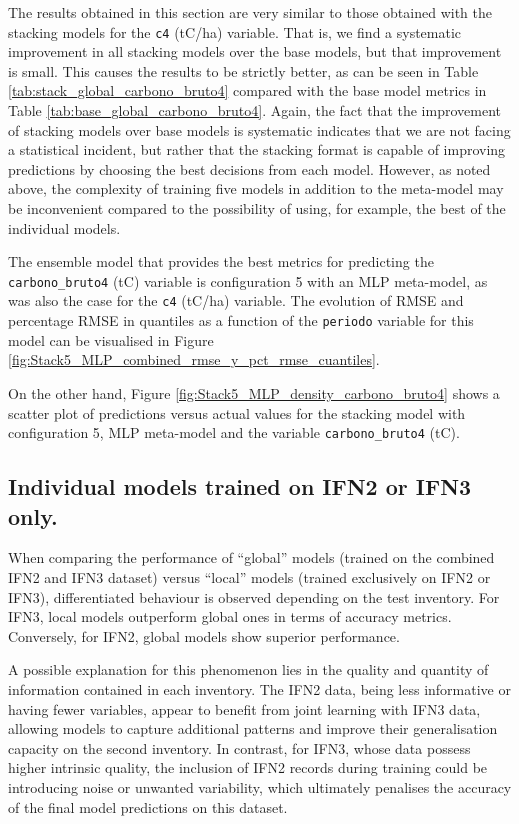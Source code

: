 The results obtained in this section are very similar to those obtained with the stacking models for the \texttt{c4} (tC/ha) variable. That is, we find a systematic improvement in all stacking models over the base models, but that improvement is small. This causes the results to be strictly better, as can be seen in Table \ref{tab:stack_global_carbono_bruto4} compared with the base model metrics in Table \ref{tab:base_global_carbono_bruto4}. Again, the fact that the improvement of stacking models over base models is systematic indicates that we are not facing a statistical incident, but rather that the stacking format is capable of improving predictions by choosing the best decisions from each model. However, as noted above, the complexity of training five models in addition to the meta-model may be inconvenient compared to the possibility of using, for example, the best of the individual models.

The ensemble model that provides the best metrics for predicting the \texttt{carbono\_bruto4} (tC) variable is configuration 5 with an MLP meta-model, as was also the case for the \texttt{c4} (tC/ha) variable. The evolution of RMSE and percentage RMSE in quantiles as a function of the \texttt{periodo} variable for this model can be visualised in Figure \ref{fig:Stack5_MLP_combined_rmse_y_pct_rmse_cuantiles}.



On the other hand, Figure \ref{fig:Stack5_MLP_density_carbono_bruto4} shows a scatter plot of predictions versus actual values for the stacking model with configuration 5, MLP meta-model and the variable \texttt{carbono\_bruto4} (tC).

\subsection{Individual models trained on IFN2 or IFN3 only.}

When comparing the performance of ``global'' models (trained on the combined IFN2 and IFN3 dataset) versus ``local'' models (trained exclusively on IFN2 or IFN3), differentiated behaviour is observed depending on the test inventory. For IFN3, local models outperform global ones in terms of accuracy metrics. Conversely, for IFN2, global models show superior performance.

A possible explanation for this phenomenon lies in the quality and quantity of information contained in each inventory. The IFN2 data, being less informative or having fewer variables, appear to benefit from joint learning with IFN3 data, allowing models to capture additional patterns and improve their generalisation capacity on the second inventory. In contrast, for IFN3, whose data possess higher intrinsic quality, the inclusion of IFN2 records during training could be introducing noise or unwanted variability, which ultimately penalises the accuracy of the final model predictions on this dataset.

